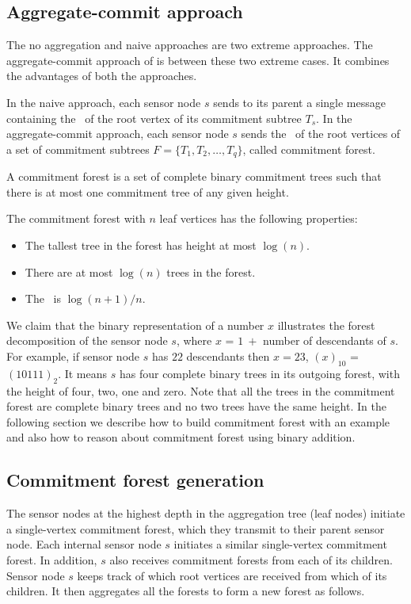 	\subsection{Aggregate-commit approach}
		The no aggregation and naive approaches are two extreme approaches.
		The aggregate-commit approach of \cite{chan2006secure} is between these two extreme cases. It combines the advantages of both the approaches.

		In the naive approach, each sensor node $s$ sends to its parent a single message containing the \payload\ of the root vertex of its commitment subtree $T_{s}$.
		In the aggregate-commit approach, each sensor node $s$ sends the \payloads\ of the root vertices of a set of commitment subtrees $F = \{ T_{1},T_{2},\dotsc,T_{q} \} $, called commitment forest. 

		\begin{definition}\cite{chan2006secure}
			A commitment forest is a set of complete binary commitment trees such that there is	at most one commitment tree of any given height.
		\end{definition}
		The commitment forest with $n$ leaf vertices has the following properties:
		\begin{itemize}
			\item The tallest tree in the forest has height at most $\log(n)$.
			\item There are at most $\log(n)$ trees in the forest.
			\item The \inforate\ is $\log(n+1) / n$.
		\end{itemize}
		We claim that the binary representation of a number $x$ illustrates the forest decomposition of the sensor node $s$, where $x$ = $1\ +$ number of descendants of $s$.
		For example, if sensor node $s$ has $22$ descendants then $x =23$, $(x)_{10}$ = $(10111)_{2}$. 
		It means $s$ has four complete binary trees in its outgoing forest, with the height of four, two, one and zero.
		Note that all the trees in the commitment forest are complete binary trees and no two trees have the same height.
		In the following section we describe how to build commitment forest with an example and also how to reason about commitment forest using binary addition. 

	\subsection{Commitment forest generation}
		The sensor nodes at the highest depth in the aggregation tree (leaf nodes) initiate a single-vertex commitment forest, which they transmit to their parent sensor node.
		Each internal sensor node $s$ initiates a similar single-vertex commitment forest.
		In addition, $s$ also receives commitment 	forests from each of its children.
		Sensor node $s$ keeps track of which root vertices are received from which of its children.
		It then aggregates all the forests to form a new forest as follows.
		
